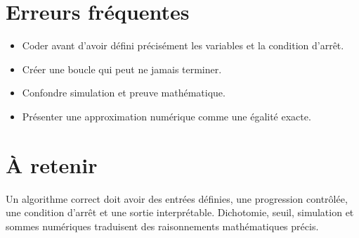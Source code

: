 \section{Erreurs fréquentes}
\begin{itemize}
\item Coder avant d’avoir défini précisément les variables et la condition d’arrêt.
\item Créer une boucle qui peut ne jamais terminer.
\item Confondre simulation et preuve mathématique.
\item Présenter une approximation numérique comme une égalité exacte.
\end{itemize}

\section{À retenir}
\begin{aretenir}
Un algorithme correct doit avoir des entrées définies, une progression contrôlée, une condition d’arrêt et une sortie interprétable. Dichotomie, seuil, simulation et sommes numériques traduisent des raisonnements mathématiques précis.
\end{aretenir}
